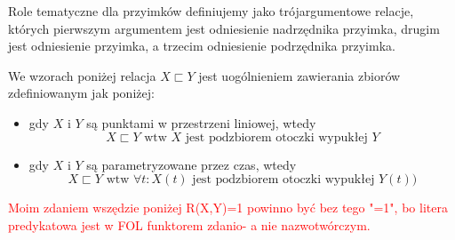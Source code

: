\documentclass[a4paper, 12pt]{article}
\theoremstyle{remark}
\begin{document}
Role tematyczne dla przyimków definiujemy jako trójargumentowe relacje, których pierwszym argumentem jest odniesienie nadrzędnika przyimka, drugim jest odniesienie przyimka, a trzecim odniesienie podrzędnika przyimka.

We wzorach poniżej relacja $X\sqsubset Y$ jest uogólnieniem zawierania zbiorów zdefiniowanym jak poniżej:
\begin{itemize}
	\item gdy $X$ i $Y$ są punktami w przestrzeni liniowej, wtedy
	\begin{equation}
	X\sqsubset Y \text{\ wtw\ } X \text{\ jest podzbiorem otoczki wypukłej\ }Y
	\end{equation}
	\item gdy $X$ i $Y$ są parametryzowane przez czas, wtedy
	\begin{equation}
	X\sqsubset Y \text{\ wtw\ } \forall t: X(t) \text{\ jest podzbiorem otoczki wypukłej\ }Y(t))
	\end{equation}
\end{itemize}


\textcolor{red}{Moim zdaniem wszędzie poniżej R(X,Y)=1 powinno być bez tego "=1", bo litera predykatowa jest w FOL funktorem zdanio- a nie nazwotwórczym.}
\end{document}
